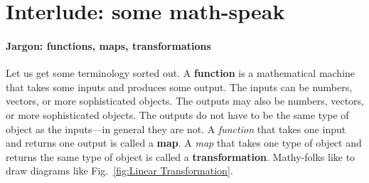 \documentclass[12pt, oneside]{report}    %
\let\oldsection\section
\def\section{%
  \setcounter{sidenote}{1}%
  \oldsection
}
\begin{document}
\section{Interlude: some math-speak}

\paragraph{Jargon: functions, maps, transformations} Let us get some terminology sorted out.
A \textbf{function} is a mathematical machine that takes some inputs and produces some output. The inputs can be numbers, vectors, or more sophisticated objects. The outputs may also be numbers, vectors, or more sophisticated objects. The outputs do not have to be the same type of object as the inputs---in general they are not.
% 
A \emph{function} that takes one input and returns one output is called a \textbf{map}. 
% 
A \emph{map} that takes one type of object and returns the same type of object is called a \textbf{transformation}. Mathy-folks like to draw diagrams like Fig.~\ref{fig:Linear Transformation}.
\end{document}
